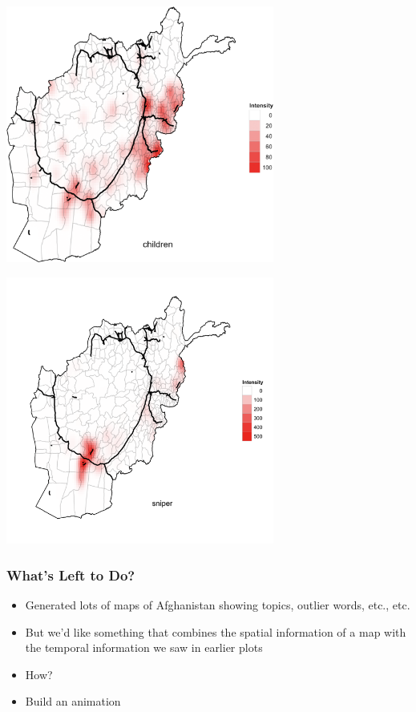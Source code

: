 \documentclass[xcolor=dvipsnames, 9pt]{beamer}
\begin{document}
\begin{frame}
  \begin{center}
    \includegraphics[width = 0.66\textwidth]{children.png}
  \end{center}
\end{frame}

\begin{frame}
  \begin{center}
    \includegraphics[width = 0.66\textwidth]{sniper.png}
  \end{center}
\end{frame}

\begin{frame}[fragile]
  \frametitle{What's Left to Do?}
  
  \begin{itemize}
    \item{Generated lots of maps of Afghanistan showing topics, outlier words, etc., etc.}
    \item{But we'd like something that combines the spatial information of a map with the temporal information we saw in earlier plots}
    \item{How?}
    \item{Build an animation}
  \end{itemize}
\end{frame}
\end{document}
